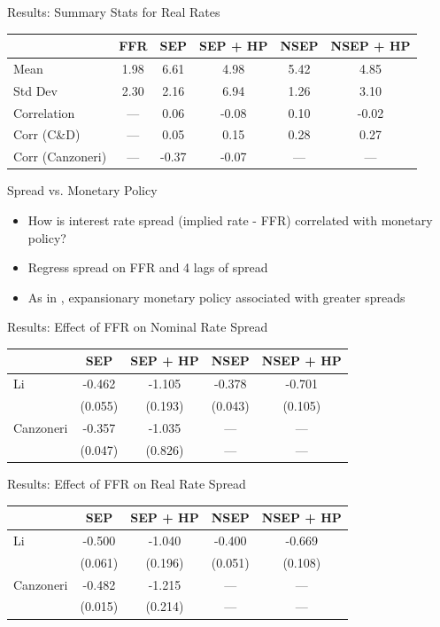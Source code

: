 \documentclass{beamer}
\begin{document}
\begin{frame}{Results: Summary Stats for Real Rates}
\begin{center}
\begin{tabular}{|l|c|cccc|} \hline
& FFR & SEP & SEP + HP & NSEP & NSEP + HP \\ \hline
Mean & 1.98 & 6.61 & 4.98 & 5.42 & 4.85 \\
Std Dev & 2.30  & 2.16 & 6.94 & 1.26 & 3.10 \\
Correlation & --- & 0.06 & -0.08 & 0.10 & -0.02 \\ \hline
Corr (C\&D) & --- & 0.05 & 0.15 & 0.28 & 0.27 \\
Corr (Canzoneri) & --- & -0.37 & -0.07 & --- & --- \\ \hline
\end{tabular}
\end{center}
\end{frame}

\begin{frame}{Spread vs. Monetary Policy}
\begin{itemize}
\item How is interest rate spread (implied rate - FFR) correlated with monetary policy?
\item Regress spread on FFR and 4 lags of spread
\item As in \cite{canzoneri07}, expansionary monetary policy associated with greater spreads
\end{itemize}
\end{frame}

\begin{frame}{Results: Effect of FFR on Nominal Rate Spread}
\begin{center}
\begin{tabular}{|l|cccc|} \hline
& SEP & SEP + HP & NSEP & NSEP + HP \\ \hline
Li & -0.462 & -1.105 & -0.378 & -0.701 \\
& (0.055) & (0.193) & (0.043) & (0.105) \\ \hline
Canzoneri & -0.357 & -1.035 & --- & --- \\ 
& (0.047) & (0.826) & --- & --- \\ \hline
\end{tabular}
\end{center}
\end{frame}

\begin{frame}{Results: Effect of FFR on Real Rate Spread}
\begin{center}
\begin{tabular}{|l|cccc|} \hline
& SEP & SEP + HP & NSEP & NSEP + HP \\ \hline
Li & -0.500 & -1.040 & -0.400 & -0.669 \\
& (0.061) & (0.196) & (0.051) & (0.108) \\ \hline
Canzoneri & -0.482 & -1.215 & --- & --- \\
& (0.015) & (0.214) & --- & --- \\ \hline
\end{tabular}
\end{center}
\end{frame}
\end{document}
